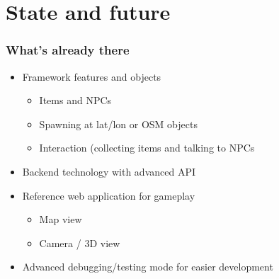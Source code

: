 \documentclass[aspectratio=43]{beamer}
\begin{document}
 \section{State and future}

 \begin{frame}
  \frametitle{What's already there}

  \begin{itemize}
   \item{Framework features and objects
    \begin{itemize}
     \item{Items and NPCs}
     \item{Spawning at lat/lon or OSM objects}
     \item{Interaction (collecting items and talking to NPCs}
    \end{itemize}
   }
   \item{Backend technology with advanced API}
   \item{Reference web application for gameplay
    \begin{itemize}
     \item{Map view}
     \item{Camera / 3D view}
    \end{itemize}
   }
   \item{Advanced debugging/testing mode for easier development}
  \end{itemize}
 \end{frame}

\end{document}
